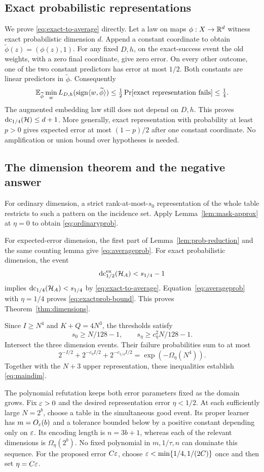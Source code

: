\subsection{Exact probabilistic representations}
We prove \eqref{eq:exact-to-average} directly. Let a law on maps $\phi:X\to\mathbb R^d$ witness exact probabilistic dimension $d$. Append a constant coordinate to obtain $\widetilde\phi(z)=(\phi(z),1)$. For any fixed $D,h$, on the exact-success event the old weights, with a zero final coordinate, give zero error. On every other outcome, one of the two constant predictors has error at most $1/2$. Both constants are linear predictors in $\widetilde\phi$. Consequently
\[
 \mathbb E_{\widetilde\phi}\min_w
 L_{D,h}(\operatorname{sign}\langle w,\widetilde\phi\rangle)
 \le \tfrac12\Pr[\text{exact representation fails}]
 \le\tfrac14.
\]
The augmented embedding law still does not depend on $D,h$. This proves $\operatorname{dc}_{1/4}(\mathcal H)\le d+1$. More generally, exact representation with probability at least $p>0$ gives expected error at most $(1-p)/2$ after one constant coordinate. No amplification or union bound over hypotheses is needed.

\subsection{The dimension theorem and the negative answer}
For ordinary dimension, a strict rank-at-most-$s_0$ representation of the whole table restricts to such a pattern on the incidence set. Apply Lemma~\ref{lem:mask-approx} at $\eta=0$ to obtain \eqref{eq:ordinaryprob}.

For expected-error dimension, the first part of Lemma~\ref{lem:prob-reduction} and the same counting lemma give \eqref{eq:averageprob}. For exact probabilistic dimension, the event
\[
 \operatorname{dc}^{\mathrm{ex}}_{1/2}(\mathcal H_A)<s_{1/4}-1
\]
implies $\operatorname{dc}_{1/4}(\mathcal H_A)<s_{1/4}$ by \eqref{eq:exact-to-average}. Equation~\eqref{eq:averageprob} with $\eta=1/4$ proves \eqref{eq:exactprob-bound}. This proves Theorem~\ref{thm:dimensions}.

Since $I\ge N^4$ and $K+Q=4N^3$, the thresholds satisfy
\[
 s_0\ge N/128-1,\qquad
 s_\eta\ge c_\eta^2N/128-1.
\]
Intersect the three dimension events. Their failure probabilities sum to at most
\[
 2^{-I/2}+2^{-c_\eta I/2}+2^{-c_{1/4}I/2}
 =\exp(-\Omega_\eta(N^4)).
\]
Together with the $N+3$ upper representation, these inequalities establish \eqref{eq:maindim}.

The polynomial refutation keeps both error parameters fixed as the domain grows. Fix $\varepsilon>0$ and the desired representation error $\eta<1/2$. At each sufficiently large $N=2^b$, choose a table in the simultaneous good event. Its proper learner has $m=O_\varepsilon(b)$ and a tolerance bounded below by a positive constant depending only on $\varepsilon$. Its encoding length is $n=3b+1$, whereas each of the relevant dimensions is $\Omega_\eta(2^b)$. No fixed polynomial in $m,1/\tau,n$ can dominate this sequence. For the proposed error $C\varepsilon$, choose $\varepsilon<\min\{1/4,1/(2C)\}$ once and then set $\eta=C\varepsilon$.

